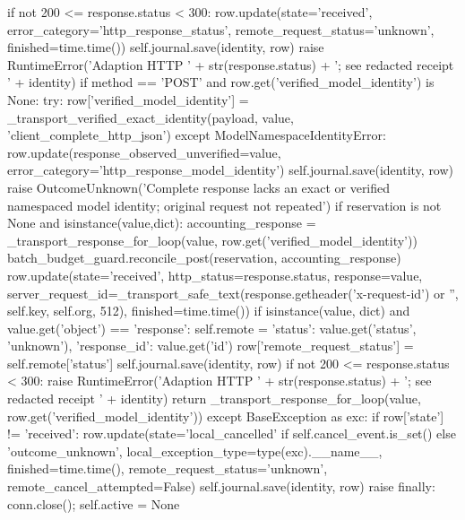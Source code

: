 {                if not 200 <= response.status < 300:
                    row.update(state='received', error_category='http_response_status',
                               remote_request_status='unknown', finished=time.time())
                    self.journal.save(identity, row)
                    raise RuntimeError('Adaption HTTP ' + str(response.status) + '; see redacted receipt ' + identity)
                if method == 'POST' and row.get('verified_model_identity') is None:
                    try:
                        row['verified_model_identity'] = _transport_verified_exact_identity(payload, value, 'client_complete_http_json')
                    except ModelNamespaceIdentityError:
                        row.update(response_observed_unverified=value, error_category='http_response_model_identity')
                        self.journal.save(identity, row)
                        raise OutcomeUnknown('Complete response lacks an exact or verified namespaced model identity; original request not repeated')
                if reservation is not None and isinstance(value,dict):
                    accounting_response = _transport_response_for_loop(value, row.get('verified_model_identity'))
                    batch_budget_guard.reconcile_post(reservation, accounting_response)
                row.update(state='received', http_status=response.status, response=value,
                           server_request_id=_transport_safe_text(response.getheader('x-request-id') or '', self.key, self.org, 512), finished=time.time())
                if isinstance(value, dict) and value.get('object') == 'response':
                    self.remote = {'status': value.get('status', 'unknown'), 'response_id': value.get('id')}
                    row['remote_request_status'] = self.remote['status']
                self.journal.save(identity, row)
                if not 200 <= response.status < 300:
                    raise RuntimeError('Adaption HTTP ' + str(response.status) + '; see redacted receipt ' + identity)
                return _transport_response_for_loop(value, row.get('verified_model_identity'))
            except BaseException as exc:
                if row['state'] != 'received':
                    row.update(state='local_cancelled' if self.cancel_event.is_set() else 'outcome_unknown',
                               local_exception_type=type(exc).__name__, finished=time.time(),
                               remote_request_status='unknown', remote_cancel_attempted=False)
                    self.journal.save(identity, row)
                raise
            finally:
                conn.close(); self.active = None

}
